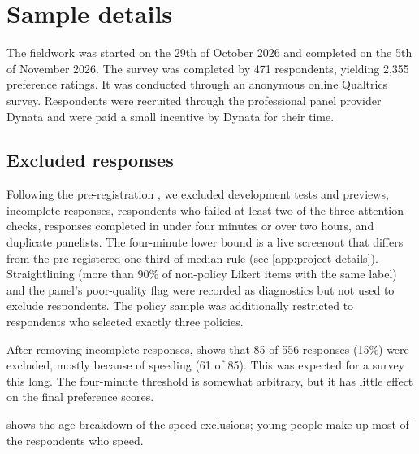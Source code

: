 
\section{Sample details}
\label{sec:survey-sample-details}

The fieldwork was started on the 29th of October 2026 and completed on the 5th of November 2026. The survey was completed by 471 respondents, yielding 2,355 preference ratings. It was conducted through an anonymous online Qualtrics survey. Respondents were recruited through the professional panel provider Dynata and were paid a small incentive by Dynata for their time.

\subsection{Excluded responses}
Following the pre-registration \cite{thompsonPreregistrationAligningLLMs2026/10/1515:17}, we excluded development tests and previews, incomplete responses, respondents who failed at least two of the three attention checks, responses completed in under four minutes or over two hours, and duplicate panelists. The four-minute lower bound is a live screenout that differs from the pre-registered one-third-of-median rule (see \ref{app:project-details}). Straightlining (more than 90\% of non-policy Likert items with the same label) and the panel's poor-quality flag were recorded as diagnostics but not used to exclude respondents. The policy sample was additionally restricted to respondents who selected exactly three policies.

After removing incomplete responses,  shows that 85 of 556 responses (15\%) were excluded, mostly because of speeding (61 of 85). This was expected for a survey this long. The four-minute threshold is somewhat arbitrary, but it has little effect on the final preference scores.


 shows the age breakdown of the speed exclusions; young people make up most of the respondents who speed.


